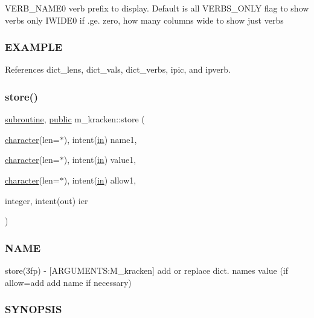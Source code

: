 V\+E\+R\+B\+\_\+\+N\+A\+M\+E0 verb prefix to display. Default is all V\+E\+R\+B\+S\+\_\+\+O\+N\+LY flag to show verbs only I\+W\+I\+D\+E0 if .ge. zero, how many columns wide to show just verbs

\subsubsection*{E\+X\+A\+M\+P\+LE}

References dict\+\_\+lens, dict\+\_\+vals, dict\+\_\+verbs, ipic, and ipverb.

\mbox{\label{namespacem__kracken_a6eb597e3ca7d161933f595788d511fd7}} 
\subsubsection{\texorpdfstring{store()}{store()}}
{\footnotesize\ttfamily \hyperlink{M__stopwatch_83_8txt_acfbcff50169d691ff02d4a123ed70482}{subroutine}, \hyperlink{M__stopwatch_83_8txt_a2f74811300c361e53b430611a7d1769f}{public} m\+\_\+kracken\+::store (\begin{DoxyParamCaption}\item[{\hyperlink{option__stopwatch_83_8txt_abd4b21fbbd175834027b5224bfe97e66}{character}(len=$\ast$), intent(\hyperlink{M__journal_83_8txt_afce72651d1eed785a2132bee863b2f38}{in})}]{name1,  }\item[{\hyperlink{option__stopwatch_83_8txt_abd4b21fbbd175834027b5224bfe97e66}{character}(len=$\ast$), intent(\hyperlink{M__journal_83_8txt_afce72651d1eed785a2132bee863b2f38}{in})}]{value1,  }\item[{\hyperlink{option__stopwatch_83_8txt_abd4b21fbbd175834027b5224bfe97e66}{character}(len=$\ast$), intent(\hyperlink{M__journal_83_8txt_afce72651d1eed785a2132bee863b2f38}{in})}]{allow1,  }\item[{integer, intent(out)}]{ier }\end{DoxyParamCaption})}



\subsubsection*{N\+A\+ME}

store(3fp) -\/ \mbox{[}A\+R\+G\+U\+M\+E\+N\+TS\+:M\+\_\+kracken\mbox{]} add or replace dict. name\textquotesingle{}s value (if allow=\textquotesingle{}add\textquotesingle{} add name if necessary) \subsubsection*{S\+Y\+N\+O\+P\+S\+IS}

